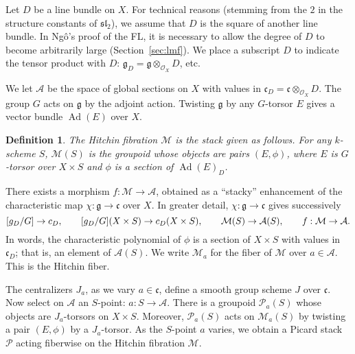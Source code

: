 \documentclass[brochure,english,12pt]{bourbaki}
\theoremstyle{plain}
\newtheorem{definition}[equation]{Definition}
\def\op#1{{\operatorname{#1}}}
\def\sl{\mathfrak{sl}}
\def\g{\mathfrak{g}}
\def\cc{\mathfrak{c}}
\def\A{{\mathcal A}}
\def\M{{\mathcal M}}
\def\P{{\mathcal P}}
\def\O{{\mathcal O}}
\begin{document}
Let $D$ be a line bundle on $X$. For technical reasons (stemming from
the $2$ in the structure constants of $\sl_2$), we assume that $D$ is
the square of another line bundle.  In Ng\^o's proof of the FL, it is
necessary to allow the degree of $D$ to become arbitrarily large
(Section~\ref{sec:lmf}).  We place a subscript $D$ to indicate the
tensor product with $D$: $\g_D = \g\otimes_{\O_X}\!\!D$, etc.

We let $\A$ be the space of global sections on $X$ with values in
$\cc_D=\cc\otimes_{\O_X}\!\!D$.  The group $G$ acts on $\g$ by the
adjoint action.  Twisting $\g$ by any $G$-torsor $E$ gives a
vector bundle $\op{Ad}(E)$ over $X$.

\begin{definition}
  The Hitchin fibration $\M$ is the stack given as follows.  For any
  $k$-scheme $S$, $\M(S)$ is the groupoid whose objects are pairs
  $(E,\phi)$, where $E$ is $G$-torsor over $X\times S$ and $\phi$ is a
  section of $\op{Ad}(E)_D$.
\end{definition}

There exists a morphism $f:\M\to\A$, obtained as a ``stacky'' enhancement of the
 characteristic map $\chi:\g\to\cc$ over $X$.  In greater
detail, $\chi:\g\to\cc$ gives successively
\[
 \hbox{}[\g_D/G]\to \cc_D,\qquad
 \hbox{}[\g_D/G](X\times S)  \to \cc_D(X\times S), \qquad
 \M(S) \to \A(S), \qquad
f:\M \to \A.
\]
In words, the characteristic polynomial of $\phi$ is a section of
$X\times S$ with values in $\cc_D$; that is, an element of $\A(S)$.
We write $\M_a$ for the fiber of $\M$ over $a\in \A$.  This is the Hitchin fiber.

The centralizers $J_a$, as we vary $a\in \cc$, define a smooth group
scheme $J$ over $\cc$.  Now select on $\A$ an $S$-point: $a:S\to\A$.
There is a groupoid $\P_a(S)$ whose objects are $J_a$-torsors on
$X\times S$.  Moreover, $\P_a(S)$ acts on $\M_a(S)$ by twisting a pair
$(E,\phi)$ by a $J_a$-torsor.  As the $S$-point $a$ varies, we obtain
a Picard stack $\P$ acting fiberwise on the Hitchin fibration $\M$.  
\end{document}
